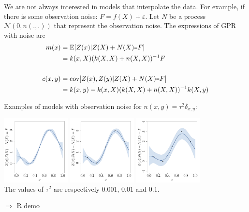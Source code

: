 \begin{frame}{}
We are not always interested in models that interpolate the data. For example, if there is some observation noise: $F = f(X) + \varepsilon$.
\vspace{5mm}
Let $N$ be a process $\mathcal{N}(0,n(.,.))$ that represent the observation noise. The expressions of GPR with noise are
\begin{equation*}
	\begin{split}
	m(x) &= \E[Z(x)|Z(X) + N(X) \shorteq F] \\
	&= k(x,X) (k(X,X)+n(X,X))^{-1} F \\
	& \\
	c(x,y) &= \Cov[Z(x),Z(y)|Z(X)+ N(X) \shorteq F] \\
	&= k(x,y) - k(x,X) (k(X,X)+n(X,X))^{-1} k(X,y)
\end{split}
\end{equation*}
\end{frame}

\begin{frame}{}
Examples of models with observation noise for $n(x,y)=\tau^2 \delta_{x,y}$:
\begin{center}
\includegraphics[height=3.5cm]{1_stat_models/figures/R/ch34_GPRnoise0001}
\includegraphics[height=3.5cm]{1_stat_models/figures/R/ch34_GPRnoise001}
\includegraphics[height=3.5cm]{1_stat_models/figures/R/ch34_GPRnoise01}\\
The values of $\tau^2$ are respectively 0.001, 0.01 and 0.1.
\end{center}
$\Rightarrow$ R demo
\end{frame}

